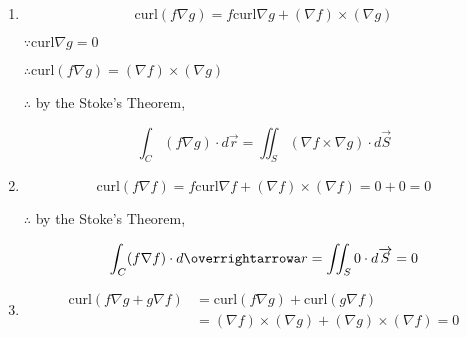 \documentclass{article}
\begin{document}
  \begin{enumerate}
    \item 
      $$\textrm{curl} (f \nabla g) = f \textrm{curl} \nabla g + (\nabla f) \times (\nabla g)$$

      $\because \textrm{curl} \nabla g = 0$

      $\therefore \textrm{curl} (f \nabla g) = (\nabla f) \times (\nabla g)$

      $\therefore $ by the Stoke's Theorem, 

      $$\int_C (f \nabla g) \cdot d \overrightarrow r = \iint_S (\nabla f \times \nabla g) \cdot d \overrightarrow S$$

    \item

      $$\textrm{curl} (f \nabla f) = f \textrm{curl} \nabla f + (\nabla f) \times (\nabla f) = 0 + 0 = 0$$

      $\therefore$ by the Stoke's Theorem,

      $$\int_C (f \nabla f) \cdot d \overrightarrowa r = \iint_S 0 \cdot d \overrightarrow S = 0$$

    \item 
      $$\begin{aligned}
        \textrm{curl} (f \nabla g + g \nabla f) &= \textrm{curl} (f \nabla g) + \textrm{curl} ( g \nabla f) \\
                                                &= (\nabla f) \times (\nabla g) + (\nabla g) \times (\nabla f) = 0
      \end{aligned}
      $$
  \end{enumerate}
\end{document}
